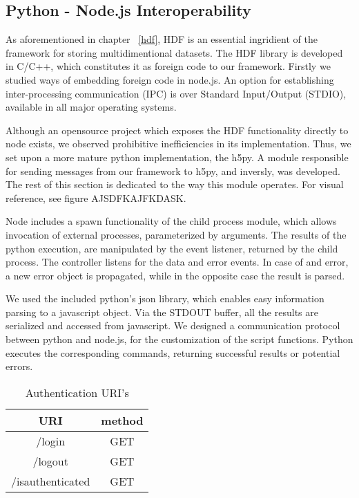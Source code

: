 \subsection{Python - Node.js Interoperability}
As aforementioned in chapter ~\ref{hdf}, HDF is an essential ingridient of the framework for storing multidimentional datasets. The HDF library is developed in C/C++, which constitutes it as foreign code to our framework. Firstly we studied ways of embedding foreign code in node.js. An option for establishing inter-processing communication (IPC) is over Standard Input/Output (STDIO), available in all major operating systems.\par 
	Although an opensource project which exposes the HDF functionality directly to node exists, we observed prohibitive inefficiencies in its implementation. Thus, we set upon a more mature python implementation, the h5py. A module responsible for sending messages from our framework to h5py, and inversly, was developed. The rest of this section is dedicated to the way this module operates. For visual reference, see figure AJSDFKAJFKDASK.\par 
Node includes a spawn functionality of the child process module, which allows invocation of external processes, parameterized by arguments. The results of the python execution, are manipulated by the event listener, returned by the child process. The controller listens for the data and error events. In case of and error, a new error object is propagated, while in the opposite case the result is parsed. \par 
We used the included python's json library, which enables easy  information parsing to a javascript object. Via the STDOUT buffer, all the results are serialized and accessed from javascript. We designed a communication protocol between python and node.js, for the customization of the script functions. Python executes the corresponding commands, returning successful results or potential errors. 


\begin{table}[]
\centering
\begin{tabular}{|c|c|}
\hline
\rowcolor[HTML]{32CB00} 
\textbf{URI}     & \textbf{method} \\ \hline
\rowcolor[HTML]{FFFFFF} 
/login           & GET             \\ \hline
\rowcolor[HTML]{67FD9A} 
/logout          & GET             \\ \hline
\rowcolor[HTML]{FFFFFF} 
/isauthenticated & GET             \\ \hline
\end{tabular}
\caption{Authentication URI's}
\label{authURI}
\end{table}


